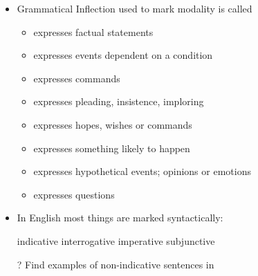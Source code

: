 \documentclass[a4paper,landscape,headrule,footrule,xetex]{foils}
\begin{document}

\begin{itemize}
\item Grammatical Inflection used to mark modality is called 
  \begin{itemize}
  \item {} expresses factual statements
  \item {} expresses events dependent on a condition
  \item {} expresses commands
  \item {} expresses pleading, insistence, imploring
  \item {} expresses hopes, wishes or commands 
  \item {} expresses something likely to happen
  \item {} expresses  hypothetical events; opinions or emotions
  \item {} expresses questions
\end{itemize}
\item In English most things are marked syntactically: \vspace*{-1ex}
    \begin{exe}
      \ex  {}  \hfill indicative
      \ex  {} \hfill interrogative
    \ex {} \hfill imperative
    \ex {} \hfill subjunctive
  \end{exe}
\item [?] Find examples of non-indicative sentences in \Story{}\task
\end{itemize}
\end{document}
